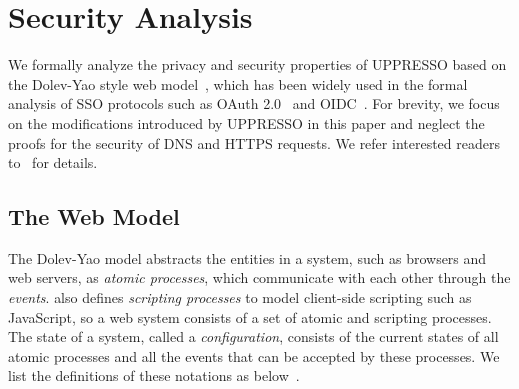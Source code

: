 \section{Security Analysis}
\label{sec:formal}

We formally analyze the privacy and security properties of UPPRESSO based on the Dolev-Yao style web model~\cite{SPRESSO}, which has been widely used in the formal analysis of SSO protocols such as OAuth 2.0~\cite{FettKS16} and OIDC~\cite{FettKS17}. For brevity, we focus on the modifications introduced by UPPRESSO in this paper and neglect the proofs for the security of DNS and HTTPS requests. We refer interested readers to~\cite{SPRESSO} for details.

\subsection{The Web Model}
\label{subsec:webmodel}
The Dolev-Yao model abstracts the entities in a system, such as browsers and web servers, as {\em atomic processes}, which communicate with each other through the {\em events}. \cite{SPRESSO} also defines {\em scripting processes} to model client-side scripting such as JavaScript, so a web system consists of a set of atomic and scripting processes. The state of a system, called a {\em configuration}, consists of the current states of all atomic processes and all the events that can be accepted by these processes. We list the definitions of these notations as below~\cite{SPRESSO}.

